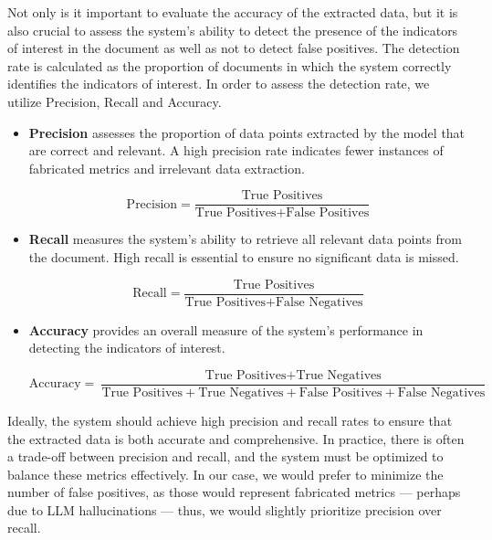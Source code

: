 \documentclass[english, 12pt, a4paper, elec, utf8, a-2b, online]{aaltothesis}
\begin{document}
Not only is it important to evaluate the accuracy of the extracted data, but it is also crucial to assess the system's ability to detect the presence of the indicators of interest in the document as well as not to detect false positives.
The detection rate is calculated as the proportion of documents in which the system correctly identifies the indicators of interest.
In order to assess the detection rate, we utilize Precision, Recall and Accuracy.

\begin{itemize}
    \item \textbf{Precision} assesses the proportion of data points extracted by the model that are correct and relevant. A high precision rate indicates fewer instances of fabricated metrics and irrelevant data extraction.

    \begin{equation}
        \text{Precision} = \frac{\text{True Positives}}{\text{True Positives} + \text{False Positives}}
    \end{equation}

    \item \textbf{Recall} measures the system's ability to retrieve all relevant data points from the document. High recall is essential to ensure no significant data is missed.

    \begin{equation}
        \text{Recall} = \frac{\text{True Positives}}{\text{True Positives} + \text{False Negatives}}
    \end{equation}

    \item \textbf{Accuracy} provides an overall measure of the system's performance in detecting the indicators of interest.

    \begin{equation}
        \text{Accuracy} = \frac{\text{True Positives} + \text{True Negatives}}{\text{True Positives} + \text{True Negatives} + \text{False Positives} + \text{False Negatives}}
    \end{equation}
\end{itemize}

Ideally, the system should achieve high precision and recall rates to ensure that the extracted data is both accurate and comprehensive.
In practice, there is often a trade-off between precision and recall, and the system must be optimized to balance these metrics effectively.
In our case, we would prefer to minimize the number of false positives, as those would represent fabricated metrics --- perhaps due to LLM hallucinations --- thus, we would slightly prioritize precision over recall.
\end{document}
